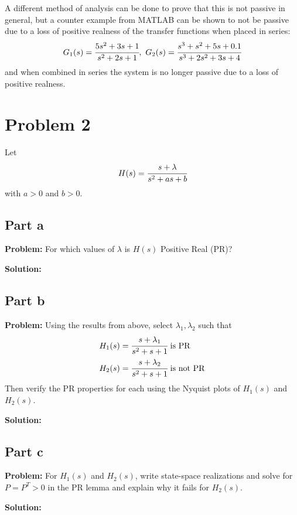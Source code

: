 \documentclass[letter]{article}
\begin{document}
A different method of analysis can be done to prove that this is not passive in general, but a counter example from MATLAB can be shown to not be passive due to a loss of positive realness of the transfer functions when placed in series:
$$G_1(s) = \cfrac{5s^2 + 3s + 1}{s^2 + 2s + 1}, \ G_2(s) = \cfrac{s^3 + s^2 + 5s + 0.1}{s^3 + 2s^2 + 3s + 4}$$
and when combined in series the system is no longer passive due to a loss of positive realness.


\newpage
\section{Problem 2}
Let $$H(s) = \cfrac{s+\lambda}{s^2 + a s + b}$$ with $a>0$ and $b>0$.

\subsection{Part a}
\textbf{Problem:}
For which values of $\lambda$ is $H(s)$ Positive Real (PR)?

\textbf{Solution:}






\subsection{Part b}
\textbf{Problem:}
Using the results from above, select $\lambda_1, \lambda_2$ such that
\begin{align*}
	H_1(s) &= \cfrac{s+\lambda_1}{s^2 + s + 1} \text{ is PR}\\
	H_2(s) &= \cfrac{s+\lambda_2}{s^2 + s + 1} \text{ is not PR}
\end{align*}
Then verify the PR properties for each using the Nyquist plots of $H_1(s)$ and $H_2(s)$.

\textbf{Solution:}







\subsection{Part c}
\textbf{Problem:}
For $H_1(s)$ and $H_2(s)$, write state-space realizations and solve for $P=P^T > 0$ in the PR lemma and explain why it fails for $H_2(s)$.

\textbf{Solution:}
\end{document}
